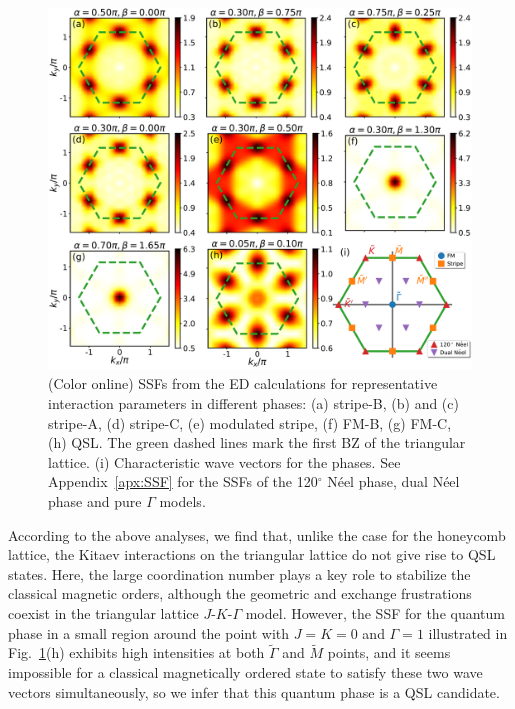 \documentclass[aps,prb,reprint,amsfonts,amsmath,amssymb,showpacs,groupedaddress,superscriptaddress]{revtex4-1}
\begin{document}
\begin{figure}
    \centering
    \includegraphics[width=\columnwidth]{fig/StructureFactors.pdf}
    \caption{\label{fig:StructureFactors}(Color online) SSFs from the ED calculations for representative interaction parameters in different phases: (a) stripe-B, (b) and (c) stripe-A, (d) stripe-C, (e) modulated stripe, (f) FM-B, (g) FM-C, (h) QSL. The green dashed lines mark the first BZ of the triangular lattice. (i) Characteristic wave vectors for the  phases. See Appendix~\ref{apx:SSF} for the SSFs of the 120$^\circ$ N\'{e}el phase, dual N\'{e}el phase and pure $\Gamma$ models.}
\end{figure}

According to the above analyses, we find that, unlike the case for the honeycomb lattice, the Kitaev interactions on the triangular lattice do not give rise to QSL states. Here, the large coordination number plays a key role to stabilize the classical magnetic orders, although the geometric and exchange frustrations coexist in the triangular lattice $J$-$K$-$\Gamma$ model. However, the SSF for the quantum phase in a small region around the point with $J=K=0$ and $\Gamma=1$ illustrated in Fig.~\ref{fig:StructureFactors}(h) exhibits high intensities at both $\tilde{\Gamma}$ and $\tilde{M}$ points, and it seems impossible for a classical magnetically ordered state to satisfy these two wave vectors simultaneously, so we infer that this quantum phase is a QSL candidate.
\end{document}
